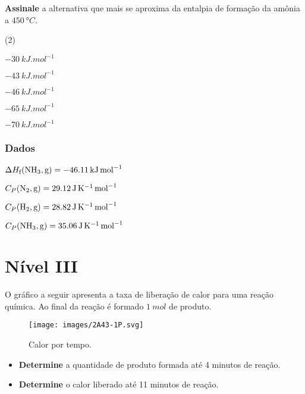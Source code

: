 \documentclass[braun, twocolumn]{braun}
\begin{document}
\begin{problem}
[2A42]\textbf{Assinale} a alternativa que mais se aproxima da entalpia de
formação da amônia a \(\qty{450}{\degree C}\).


\begin{choices}
(2)
\item \(\qty{-30}{kJ.mol^{-1}}\)

\item \(\qty{-43}{kJ.mol^{-1}}\)

\item \(\qty{-46}{kJ.mol^{-1}}\)

\item \(\qty{-65}{kJ.mol^{-1}}\)

\item \(\qty{-70}{kJ.mol^{-1}}\)

\end{choices}
\subsubsection*{Dados}


\begin{datalist}

\item $\Delta H_\text{f}(\ce{NH3, {g}}) = \qty{-46,11}{kJ.mol^{-1}}$
\item $C_P(\ce{N2, {g}}) = \qty{29,12}{J.K^{-1}.mol^{-1}}$
\item $C_P(\ce{H2, {g}}) = \qty{28,82}{J.K^{-1}.mol^{-1}}$
\item $C_P(\ce{NH3, {g}}) = \qty{35,06}{J.K^{-1}.mol^{-1}}$
\end{datalist}

\end{problem}
\section{Nível III}


\begin{problem}
[2A43]O gráfico a seguir apresenta a taxa de liberação de calor para uma
reação química. Ao final da reação é formado \(\qty{1}{mol}\) de produto.

\begin{figure}
\centering
\texttt{[image: images/2A43-1P.svg]}
\caption{Calor por tempo.}
\end{figure}

\begin{itemize}

\item
  \textbf{Determine} a quantidade de produto formada até 4 minutos de
  reação.
\item
  \textbf{Determine} o calor liberado até 11 minutos de reação.
\end{itemize}

\end{problem}
\end{document}
